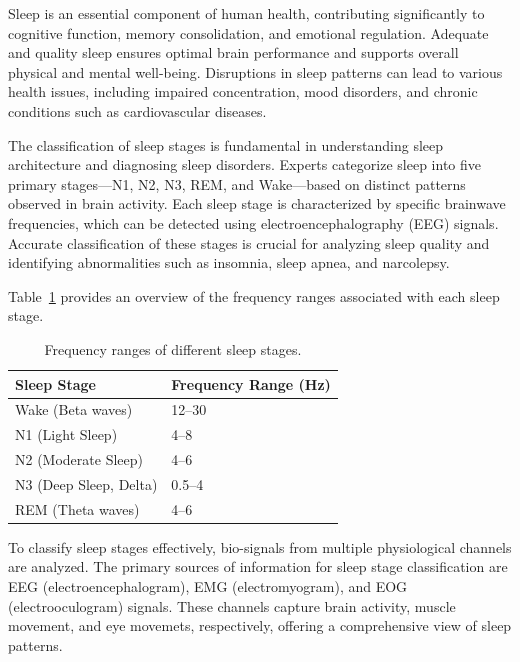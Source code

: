 

Sleep is an essential component of human health, contributing significantly to cognitive function, memory consolidation, and emotional regulation. Adequate and quality sleep ensures optimal brain performance and supports overall physical and mental well-being. Disruptions in sleep patterns can lead to various health issues, including impaired concentration, mood disorders, and chronic conditions such as cardiovascular diseases.

The classification of sleep stages is fundamental in understanding sleep architecture and diagnosing sleep disorders. Experts categorize sleep into five primary stages—N1, N2, N3, REM, and Wake—based on distinct patterns observed in brain activity. Each sleep stage is characterized by specific brainwave frequencies, which can be detected using electroencephalography (EEG) signals. Accurate classification of these stages is crucial for analyzing sleep quality and identifying abnormalities such as insomnia, sleep apnea, and narcolepsy.


Table~\ref{tab:sleep_stages} provides an overview of the frequency ranges associated with each sleep stage. 

\begin{table}[h]
\centering
\caption{Frequency ranges of different sleep stages.}
\begin{tabular}{ll}
\toprule
\textbf{Sleep Stage} & \textbf{Frequency Range (Hz)} \\
\midrule
Wake (Beta waves)       & 12--30 \\
N1 (Light Sleep)        & 4--8  \\
N2 (Moderate Sleep)     & 4--6  \\
N3 (Deep Sleep, Delta)  & 0.5--4  \\
REM (Theta waves)       & 4--6  \\
\bottomrule
\end{tabular}
\label{tab:sleep_stages}
\end{table}

To classify sleep stages effectively, bio-signals from multiple physiological channels are analyzed. The primary sources of information for sleep stage classification are EEG (electroencephalogram), EMG (electromyogram), and EOG (electrooculogram) signals. These channels capture brain activity, muscle movement, and eye movemets, respectively, offering a comprehensive view of sleep patterns.

